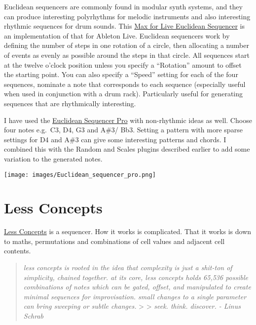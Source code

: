 \documentclass[
  12pt,
  letterpaper,
  oneside,
  open=any]{scrbook}
\begin{document}
Euclidean sequencers are commonly found in modular synth systems, and
they can produce interesting polyrhythms for melodic instruments and
also interesting rhythmic sequences for drum sounds. This
\href{https://maxforlive.com/library/device/7608/euclidean-sequencer-pro}{Max
for Live Euclidean Sequencer} is an implementation of that for Ableton
Live. Euclidean sequencers work by defining the number of steps in one
rotation of a circle, then allocating a number of events as evenly as
possible around the steps in that circle. All sequences start at the
twelve o'clock position unless you specify a ``Rotation'' amount to
offset the starting point. You can also specify a ``Speed'' setting for
each of the four sequences, nominate a note that corresponds to each
sequence (especially useful when used in conjunction with a drum rack).
Particularly useful for generating sequences that are rhythmically
interesting.

I have used the
\href{https://www.youtube.com/watch?v=orh9TtREa0w}{Euclidean Sequencer
Pro} with non-rhythmic ideas as well. Choose four notes e.g.~C3, D4, G3
and A\#3/ Bb3. Setting a pattern with more sparse settings for D4 and
A\#3 can give some interesting patterns and chords. I combined this with
the Random and Scales plugins described earlier to add some variation to
the generated notes.

\texttt{[image: images/Euclidean\_sequencer\_pro.png]}

\section{Less Concepts}\label{less-concepts}

\href{https://maxforlive.com/library/device/6167/less-concepts}{Less
Concepts} is a sequencer. How it works is complicated. That it works is
down to maths, permutations and combinations of cell values and adjacent
cell contents.

\begin{quote}
\emph{less concepts is rooted in the idea that complexity is just a
shit-ton of simplicity, chained together. at its core, less concepts
holds 65,536 possible combinations of notes which can be gated, offset,
and manipulated to create minimal sequences for improvisation. small
changes to a single parameter can bring sweeping or subtle changes.}
\textgreater{} \textgreater{} \emph{seek. think. discover. - Linus
Schrab}
\end{quote}
\end{document}
